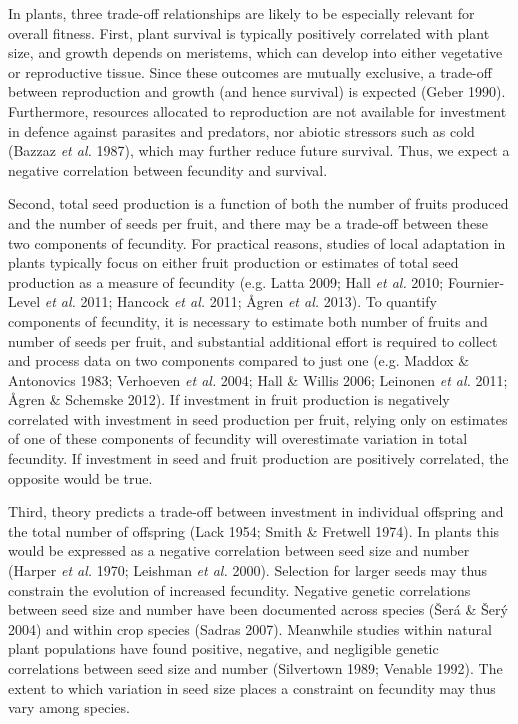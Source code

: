 \documentclass[12pt,]{article}
\begin{document}
In plants, three trade-off relationships are likely to be especially relevant for overall fitness. First, plant survival is typically positively correlated with plant size, and growth depends on meristems, which can develop into either vegetative or reproductive tissue. Since these outcomes are mutually exclusive, a trade-off between reproduction and growth (and hence survival) is expected (Geber 1990). Furthermore, resources allocated to reproduction are not available for investment in defence against parasites and predators, nor abiotic stressors such as cold (Bazzaz \emph{et al.} 1987), which may further reduce future survival. Thus, we expect a negative correlation between fecundity and survival.

Second, total seed production is a function of both the number of fruits produced and the number of seeds per fruit, and there may be a trade-off between these two components of fecundity. For practical reasons, studies of local adaptation in plants typically focus on either fruit production or estimates of total seed production as a measure of fecundity (e.g. Latta 2009; Hall \emph{et al.} 2010; Fournier-Level \emph{et al.} 2011; Hancock \emph{et al.} 2011; Ågren \emph{et al.} 2013).
To quantify components of fecundity, it is necessary to estimate both number of fruits and number of seeds per fruit, and substantial additional effort is required to collect and process data on two components compared to just one (e.g. Maddox \& Antonovics 1983; Verhoeven \emph{et al.} 2004; Hall \& Willis 2006; Leinonen \emph{et al.} 2011; Ågren \& Schemske 2012). If investment in fruit production is negatively correlated with investment in seed production per fruit, relying only on estimates of one of these components of fecundity will overestimate variation in total fecundity. If investment in seed and fruit production are positively correlated, the opposite would be true.

Third, theory predicts a trade-off between investment in individual offspring and the total number of offspring (Lack 1954; Smith \& Fretwell 1974). In plants this would be expressed as a negative correlation between seed size and number (Harper \emph{et al.} 1970; Leishman \emph{et al.} 2000). Selection for larger seeds may thus constrain the evolution of increased fecundity. Negative genetic correlations between seed size and number have been documented across species (Šerá \& Šerý 2004) and within crop species (Sadras 2007). Meanwhile studies within natural plant populations have found positive, negative, and negligible genetic correlations between seed size and number (Silvertown 1989; Venable 1992).
The extent to which variation in seed size places a constraint on fecundity may thus vary among species.
\end{document}
